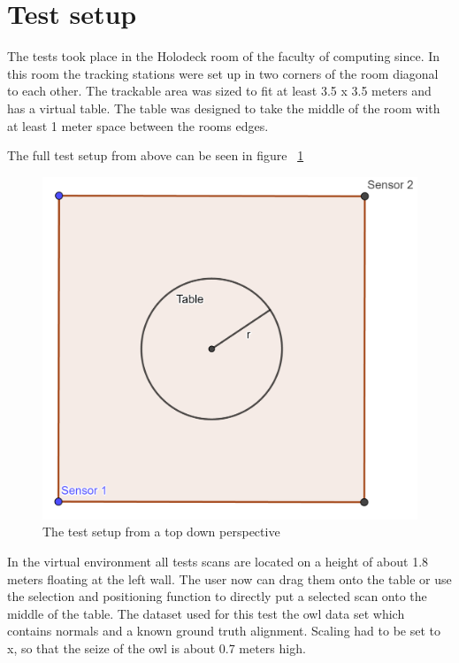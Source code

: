 \documentclass[hyperref,english,bachelorofscience,bibnum,twoside]{cgvpub}
\begin{document}
\section{Test setup}

The tests took place in the Holodeck room of the faculty of computing since. In this room the tracking stations were set up in two corners of the room diagonal to each other. The trackable area was sized to fit at least 3.5 x 3.5 meters and has a virtual table. The table was designed to take the middle of the room with at least 1 meter space between the rooms edges.

The full test setup from above can be seen in figure ~\ref{fig:test}

\begin{figure}[htbp]
	\centering
		\includegraphics[width= \linewidth]{test_setup.png}
	\caption{The test setup from a top down perspective}
	\label{fig:test}
\end{figure}

In the virtual environment all tests scans are located on a height of about 1.8 meters floating at the left wall. The user now can drag them onto the table or use the selection and positioning function to directly put a selected scan onto the middle of the table.
The dataset used for this test the owl data set which contains normals and a known ground truth alignment. Scaling had to be set to x, so that the seize of the owl is about 0.7 meters high.
\end{document}
